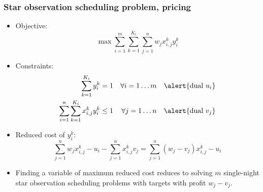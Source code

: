 \documentclass[10pt]{beamer}
\begin{document}
\begin{frame}
  \frametitle{Star observation scheduling problem, pricing}

  \begin{itemize}
    \item Objective:
      \begin{displaymath}
        \max \sum_{i = 1}^m \sum_{k = 1}^{K_i} \sum_{j = 1}^n w_j x_{i, j}^k y_i^k
      \end{displaymath}

    \item Constraints:
      \begin{align*}
        \sum_{k = 1}^{K_i} y_i^k = 1 && \forall i = 1 \dots m && \alert{\text{dual } u_i} \\
        \sum_{i = 1}^n \sum_{k = 1}^{K_i} x_{i, j}^k y_i^k \le 1 && \forall j = 1 \dots n && \alert{\text{dual } v_j} \\
      \end{align*}

    \item \pause Reduced cost of $y_i^k$:
      \begin{displaymath}
        \sum_{j = 1}^n w_j x_{i, j}^k - u_i - \sum_{j = 1}^n x_{i, j}^k v_j
        = \sum_{j = 1}^n (w_j - v_j) x_{i, j}^k - u_i
      \end{displaymath}

    \item \pause Finding a variable of maximum reduced cost reduces to solving $m$ single-night star observation scheduling problems with targets with profit $w_j - v_j$.
  \end{itemize}
\end{frame}
\end{document}
